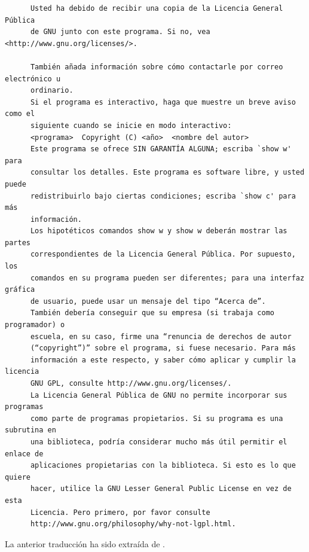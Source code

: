 \begin{verbatim}
      Usted ha debido de recibir una copia de la Licencia General Pública
      de GNU junto con este programa. Si no, vea <http://www.gnu.org/licenses/>.

      También añada información sobre cómo contactarle por correo electrónico u
      ordinario.
      Si el programa es interactivo, haga que muestre un breve aviso como el
      siguiente cuando se inicie en modo interactivo:
      <programa>  Copyright (C) <año>  <nombre del autor>
      Este programa se ofrece SIN GARANTÍA ALGUNA; escriba `show w' para
      consultar los detalles. Este programa es software libre, y usted puede
      redistribuirlo bajo ciertas condiciones; escriba `show c' para más
      información.
      Los hipotéticos comandos show w y show w deberán mostrar las partes
      correspondientes de la Licencia General Pública. Por supuesto, los
      comandos en su programa pueden ser diferentes; para una interfaz gráfica
      de usuario, puede usar un mensaje del tipo “Acerca de”.
      También debería conseguir que su empresa (si trabaja como programador) o
      escuela, en su caso, firme una “renuncia de derechos de autor
      (“copyright”)” sobre el programa, si fuese necesario. Para más
      información a este respecto, y saber cómo aplicar y cumplir la licencia
      GNU GPL, consulte http://www.gnu.org/licenses/.
      La Licencia General Pública de GNU no permite incorporar sus programas
      como parte de programas propietarios. Si su programa es una subrutina en
      una biblioteca, podría considerar mucho más útil permitir el enlace de
      aplicaciones propietarias con la biblioteca. Si esto es lo que quiere
      hacer, utilice la GNU Lesser General Public License en vez de esta
      Licencia. Pero primero, por favor consulte
      http://www.gnu.org/philosophy/why-not-lgpl.html.
\end{verbatim}
\normalsize

La anterior traducción ha sido extraída de \cite{gpl-es}.
